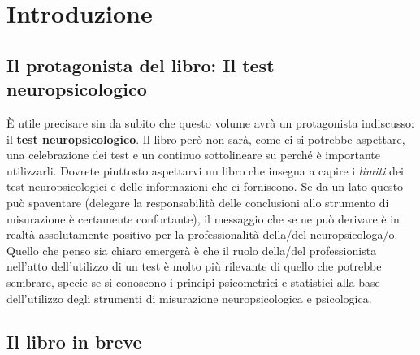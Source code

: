 \documentclass[
  italian,
  letterpaper,
  paper=6in:9in,
  pagesize=pdftex,
  headinclude=on,
  footinclude=on,
  11pt]{scrbook}
\begin{document}

\chapter*{Introduzione}\label{introduzione}


\section*{Il protagonista del libro: Il test
neuropsicologico}\label{il-protagonista-del-libro-il-test-neuropsicologico}


È utile precisare sin da subito che questo volume avrà un protagonista
indiscusso: il \textbf{test neuropsicologico}. Il libro però non sarà,
come ci si potrebbe aspettare, una celebrazione dei test e un continuo
sottolineare su perché è importante utilizzarli. Dovrete piuttosto
aspettarvi un libro che insegna a capire i \emph{limiti} dei test
neuropsicologici e delle informazioni che ci forniscono. Se da un lato
questo può spaventare (delegare la responsabilità delle conclusioni allo
strumento di misurazione è certamente confortante), il messaggio che se
ne può derivare è in realtà assolutamente positivo per la
professionalità della/del neuropsicologa/o. Quello che penso sia chiaro
emergerà è che il ruolo della/del professionista nell'atto dell'utilizzo
di un test è molto più rilevante di quello che potrebbe sembrare, specie
se si conoscono i principi psicometrici e statistici alla base
dell'utilizzo degli strumenti di misurazione neuropsicologica e
psicologica.

\section*{Il libro in breve}\label{il-libro-in-breve}

\end{document}
